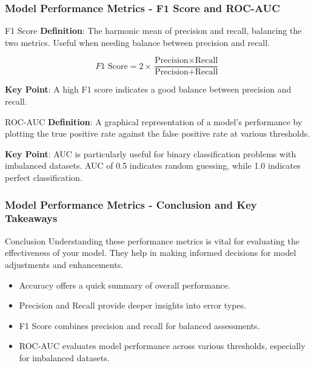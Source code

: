 \documentclass[aspectratio=169]{beamer}
\begin{document}
\begin{frame}[fragile]
    \frametitle{Model Performance Metrics - F1 Score and ROC-AUC}
    \begin{block}{F1 Score}
        \textbf{Definition}: The harmonic mean of precision and recall, balancing the two metrics. Useful when needing balance between precision and recall.
        
        \begin{equation}
            F1 \text{ Score} = 2 \times \frac{\text{Precision} \times \text{Recall}}{\text{Precision} + \text{Recall}}
        \end{equation}
        
        \textbf{Key Point}: A high F1 score indicates a good balance between precision and recall.
    \end{block}
    
    \begin{block}{ROC-AUC}
        \textbf{Definition}: A graphical representation of a model's performance by plotting the true positive rate against the false positive rate at various thresholds.
        
        \textbf{Key Point}: AUC is particularly useful for binary classification problems with imbalanced datasets. AUC of 0.5 indicates random guessing, while 1.0 indicates perfect classification.
    \end{block}
\end{frame}

\begin{frame}[fragile]
    \frametitle{Model Performance Metrics - Conclusion and Key Takeaways}
    \begin{block}{Conclusion}
        Understanding these performance metrics is vital for evaluating the effectiveness of your model. They help in making informed decisions for model adjustments and enhancements.
    \end{block}
    
    \begin{itemize}
        \item Accuracy offers a quick summary of overall performance.
        \item Precision and Recall provide deeper insights into error types.
        \item F1 Score combines precision and recall for balanced assessments.
        \item ROC-AUC evaluates model performance across various thresholds, especially for imbalanced datasets.
    \end{itemize}
\end{frame}
\end{document}
